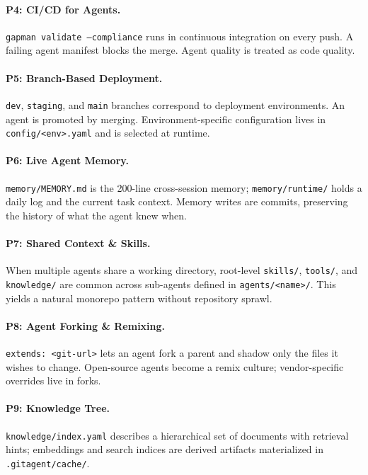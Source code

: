 \documentclass[11pt,a4paper]{article}
\begin{document}
\paragraph{P4: CI/CD for Agents.}
\texttt{gapman validate --compliance} runs in continuous integration on every push.
A failing agent manifest blocks the merge. Agent quality is treated as code quality.

\paragraph{P5: Branch-Based Deployment.}
\texttt{dev}, \texttt{staging}, and \texttt{main} branches correspond to deployment
environments. An agent is promoted by merging. Environment-specific configuration
lives in \texttt{config/<env>.yaml} and is selected at runtime.

\paragraph{P6: Live Agent Memory.}
\texttt{memory/MEMORY.md} is the 200-line cross-session memory; \texttt{memory/runtime/}
holds a daily log and the current task context. Memory writes are commits, preserving
the history of what the agent knew when.

\paragraph{P7: Shared Context \& Skills.}
When multiple agents share a working directory, root-level \texttt{skills/},
\texttt{tools/}, and \texttt{knowledge/} are common across sub-agents defined in
\texttt{agents/<name>/}. This yields a natural monorepo pattern without repository
sprawl.

\paragraph{P8: Agent Forking \& Remixing.}
\texttt{extends: <git-url>} lets an agent fork a parent and shadow only the files it
wishes to change. Open-source agents become a remix culture; vendor-specific overrides
live in forks.

\paragraph{P9: Knowledge Tree.}
\texttt{knowledge/index.yaml} describes a hierarchical set of documents with
retrieval hints; embeddings and search indices are derived artifacts
materialized in \texttt{.gitagent/cache/}.
\end{document}
